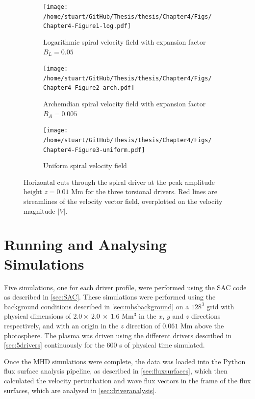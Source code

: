 \documentclass[a4paper,12pt,fourier,authoryear,custommargin]{Classes/PhDThesisPSnPDF}
\begin{document}
\begin{figure}
    \centering
    

    \begin{subfigure}[b]{0.7\columnwidth}
        \texttt{[image: /home/stuart/GitHub/Thesis/thesis/Chapter4/Figs/Chapter4-Figure1-log.pdf]}
        \caption{Logarithmic spiral velocity field with expansion factor $B_L=0.05$}
        \label{fig:log}
    \end{subfigure}

    \begin{subfigure}[b]{0.7\columnwidth}
        \texttt{[image: /home/stuart/GitHub/Thesis/thesis/Chapter4/Figs/Chapter4-Figure2-arch.pdf]}
        \caption{Archemdian spiral velocity field with expansion factor $B_A=0.005$}
        \label{fig:arch}
    \end{subfigure}

    \begin{subfigure}[b]{0.7\columnwidth}
        \texttt{[image: /home/stuart/GitHub/Thesis/thesis/Chapter4/Figs/Chapter4-Figure3-uniform.pdf]}
        \caption{Uniform spiral velocity field}
        \label{fig:uniform}
    \end{subfigure}
    \caption{Horizontal cuts through the spiral driver at the peak amplitude height $z = 0.01$ Mm for the three torsional drivers. Red lines are streamlines of the velocity vector field, overplotted on the velocity magnitude $|V|$.}
    \label{fig:driver_figs}
\end{figure}

\section{Running and Analysing Simulations}

Five simulations, one for each driver profile, were performed using the SAC code as described in \cref{sec:SAC}.
These simulations were performed using the background conditions described in \cref{sec:mhsbackground} on a $128^3$ grid with physical dimensions of $2.0 \times\ 2.0\ \times\ 1.6$ Mm$^3$ in the $x$, $y$ and $z$ directions respectively, and with an origin in the $z$ direction of $0.061$ Mm above the photosphere.
The plasma was driven using the different drivers described in \cref{sec:5drivers} continuously for the $600$ s of physical time simulated.

Once the MHD simulations were complete, the data was loaded into the Python flux surface analysis pipeline, as described in \cref{sec:fluxsurfaces}, which then calculated the velocity perturbation and wave flux vectors in the frame of the flux surfaces, which are analysed in \cref{sec:driveranalysis}.
\end{document}
